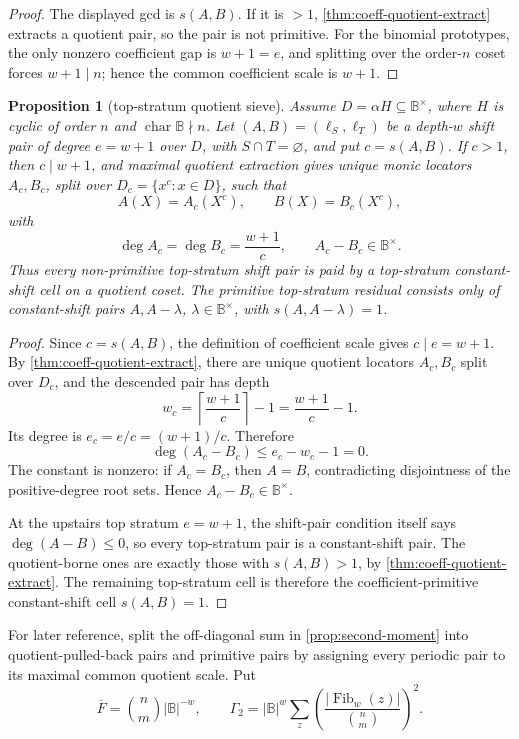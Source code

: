 \documentclass[a4paper,11pt]{amsart}
\newtheorem{proposition}[theorem]{Proposition}
\theoremstyle{remark}
\newcommand{\B}{\mathbb B}
\newcommand{\Fib}{\operatorname{Fib}}
\begin{document}
\begin{proof}
The displayed gcd is \(s(A,B)\).  If it is \(>1\), \cref{thm:coeff-quotient-extract} extracts a quotient pair, so the pair is not primitive.  For the binomial prototypes, the only nonzero coefficient gap is \(w+1=e\), and splitting over the order-\(n\) coset forces \(w+1\mid n\); hence the common coefficient scale is \(w+1\).
\end{proof}

\begin{proposition}[top-stratum quotient sieve]\label{prop:top-stratum-quotient-sieve}
Assume \(D=\alpha H\subseteq\B^\times\), where \(H\) is cyclic of order \(n\) and \(\operatorname{char}\B\nmid n\).  Let \((A,B)=(\ell_S,\ell_T)\) be a depth-\(w\) shift pair of degree \(e=w+1\) over \(D\), with \(S\cap T=\varnothing\), and put \(c=s(A,B)\).  If \(c>1\), then \(c\mid w+1\), and maximal quotient extraction gives unique monic locators \(A_c,B_c\), split over \(D_c=\{x^c:x\in D\}\), such that
\[
        A(X)=A_c(X^c),\qquad B(X)=B_c(X^c),
\]
with
\[
        \deg A_c=\deg B_c=\frac{w+1}{c},
        \qquad
        A_c-B_c\in\B^\times .
\]
Thus every non-primitive top-stratum shift pair is paid by a top-stratum constant-shift cell on a quotient coset.  The primitive top-stratum residual consists only of constant-shift pairs \(A,A-\lambda\), \(\lambda\in\B^\times\), with \(s(A,A-\lambda)=1\).
\end{proposition}

\begin{proof}
Since \(c=s(A,B)\), the definition of coefficient scale gives \(c\mid e=w+1\).  By \cref{thm:coeff-quotient-extract}, there are unique quotient locators \(A_c,B_c\) split over \(D_c\), and the descended pair has depth
\[
        w_c=\left\lceil \frac{w+1}{c}\right\rceil-1
        =\frac{w+1}{c}-1 .
\]
Its degree is \(e_c=e/c=(w+1)/c\).  Therefore
\[
        \deg(A_c-B_c)\le e_c-w_c-1=0 .
\]
The constant is nonzero: if \(A_c=B_c\), then \(A=B\), contradicting disjointness of the positive-degree root sets.  Hence \(A_c-B_c\in\B^\times\).

At the upstairs top stratum \(e=w+1\), the shift-pair condition itself says \(\deg(A-B)\le0\), so every top-stratum pair is a constant-shift pair.  The quotient-borne ones are exactly those with \(s(A,B)>1\), by \cref{thm:coeff-quotient-extract}.  The remaining top-stratum cell is therefore the coefficient-primitive constant-shift cell \(s(A,B)=1\).
\end{proof}

For later reference, split the off-diagonal sum in \cref{prop:second-moment} into quotient-pulled-back pairs and primitive pairs by assigning every periodic pair to its maximal common quotient scale.  Put
\[
        \overline F=\binom{n}{m}|\B|^{-w},
        \qquad
        \Gamma_2=|\B|^w\sum_z\left(\frac{|\Fib_w(z)|}{\binom{n}{m}}\right)^2 .
\]
\end{document}
